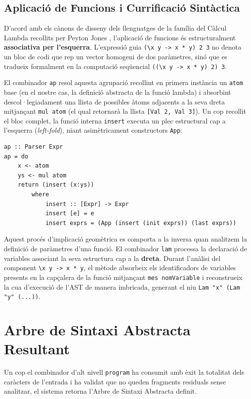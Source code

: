 \subsection{Aplicació de Funcions i Currificació Sintàctica}
D'acord amb els cànons de disseny dels llenguatges de la família del Càlcul Lambda recollits per Peyton Jones \cite{peyton1987implementation}, l'aplicació de funcions és estructuralment \textbf{associativa per l'esquerra}. L'expressió guia \texttt{(\textbackslash x y -> x * y) 2 3} no denota un bloc de codi que rep un vector homogeni de dos paràmetres, sinó que es tradueix formalment en la computació seqüencial \texttt{((\textbackslash x y -> x * y) 2) 3}.

El combinador \texttt{ap} resol aquesta agrupació recollint en primera instància un \texttt{atom} base (en el nostre cas, la definició abstracta de la funció lambda) i absorbint descol·legiadament una llista de possibles àtoms adjacents a la seva dreta mitjançant \texttt{mul atom} (el qual retornarà la llista \texttt{[Val 2, Val 3]}). Un cop recollit el bloc complet, la funció interna \texttt{insert} executa un plec estructural cap a l'esquerra (\textit{left-fold}), niant asimètricament constructors \texttt{App}:

\begin{lstlisting}[style=haskellstyle, caption=Associativitat per l'esquerra en el combinador d'aplicació]
ap :: Parser Expr
ap = do
    x <- atom
    ys <- mul atom
    return (insert (x:ys))
        where
            insert :: [Expr] -> Expr
            insert [e] = e
            insert exprs = (App (insert (init exprs)) (last exprs))
\end{lstlisting}

Aquest procés d'implicació geomètrica es comporta a la inversa quan analitzem la definició de paràmetres d'una funció. El combinador \texttt{lam} processa la declaració de variables associant la seva estructura cap a la \textbf{dreta}. Durant l'anàlisi del component \texttt{\textbackslash x y -> x * y}, el mètode absorbeix els identificadors de variables presents en la capçalera de la funció mitjançant \texttt{mes nomVariable} i reconstrueix la cua d'execució de l'AST de manera imbricada, generant el niu \texttt{Lam "x" (Lam "y" (...))}.

\section{Arbre de Sintaxi Abstracta Resultant}
Un cop el combinador d'alt nivell \texttt{program} ha consumit amb èxit la totalitat dels caràcters de l'entrada i ha validat que no queden fragments residuals sense analitzar, el sistema retorna l'Arbre de Sintaxi Abstracta definit. 

